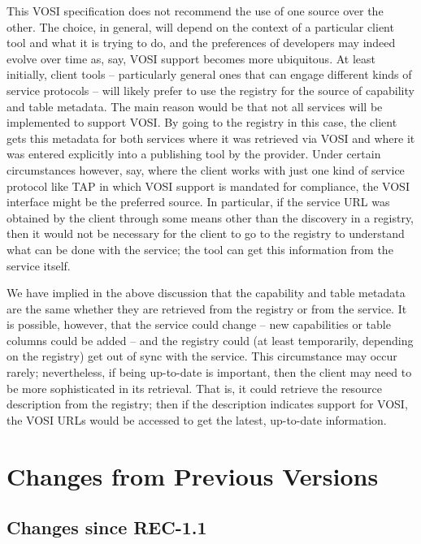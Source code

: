 \documentclass[11pt,letter]{ivoa}
\begin{document}
This VOSI specification does not recommend the use of one source over
the other. The choice, in general, will depend on the context of a
particular client tool and what it is trying to do, and the preferences
of developers may indeed evolve over time as, say, VOSI support becomes
more ubiquitous. At least initially, client tools -- particularly
general ones that can engage different kinds of service protocols --
will likely prefer to use the registry for the source of capability and
table metadata. The main reason would be that not all services will be
implemented to support VOSI. By going to the registry in this case, the
client gets this metadata for both services where it was retrieved via
VOSI and where it was entered explicitly into a publishing tool by the
provider. Under certain circumstances however, say, where the client
works with just one kind of service protocol like TAP in which VOSI
support is mandated for compliance, the VOSI interface might be the
preferred source. In particular, if the service URL was obtained by the
client through some means other than the discovery in a registry, then
it would not be necessary for the client to go to the registry to
understand what can be done with the service; the tool can get this
information from the service itself. 

We have implied in the above discussion that the capability and table
metadata are the same whether they are retrieved from the registry or
from the service. It is possible, however, that the service could change
-- new capabilities or table columns could be added -- and the registry
could (at least temporarily, depending on the registry) get out of sync
with the service. This circumstance may occur rarely; nevertheless, if
being up-to-date is important, then the client may need to be more
sophisticated in its retrieval. That is, it could retrieve the resource
description from the registry; then if the description indicates support
for VOSI, the VOSI URLs would be accessed to get the latest, up-to-date
information. 

\section{Changes from Previous Versions}
\label{appendix:changes}

\subsection{Changes since REC-1.1}
\end{document}
